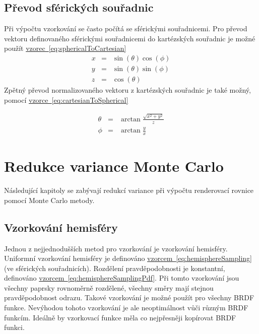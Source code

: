 \documentclass[czech,master]{diploma}
\begin{document}
\section{Převod sférických souřadnic}
Při výpočtu vzorkování se často počítá se sférickými souřadnicemi. Pro převod vektoru definovaného sférickými souřadnicemi do kartézských souřadnic je možné použít \hyperref[eq:sphericalToCartesian]{vzorec~\ref{eq:sphericalToCartesian}}
\begin{eqnarray}
  x & = & \sin(\theta)\cos(\phi)\nonumber \\
  y & = & \sin(\theta)\sin(\phi)\nonumber \\
  z & = & \cos(\theta)\label{eq:sphericalToCartesian}
\end{eqnarray}
Zpětný převod normalizovaného vektoru z kartézských souřadnic je také možný, pomocí \hyperref[eq:cartesianToSpherical]{vzorce~\ref{eq:cartesianToSpherical}}

\begin{eqnarray}
  \theta & = & \arctan \frac{\sqrt{x^2 + y^2}}{z} \nonumber \\
  \phi & = & \arctan \frac{y}{x}\label{eq:cartesianToSpherical}
\end{eqnarray}

\clearpage
\chapter{Redukce variance Monte Carlo}\label{sec:reduction}
Následující kapitoly se zabývají redukcí variance při výpočtu renderovací rovnice pomocí Monte Carlo metody.

\section{Vzorkování hemisféry} \label{sec:hemisphere}
Jednou z nejjednodušších metod pro vzorkování je vzorkování hemisféry. Uniformní vzorkování hemisféry je definováno \hyperref[eq:hemisphereSampling]{vzorcem~\ref{eq:hemisphereSampling}} (ve sférických souřadnicích). Rozdělení pravděpodobnosti je konstantní, definováno \hyperref[eq:hemisphereSamplingPdf]{vzorcem~\ref{eq:hemisphereSamplingPdf}}. Při tomto vzorkování jsou všechny paprsky rovnoměrně rozdělené, všechny směry mají stejnou pravděpodobnost odrazu. Takové vzorkování je možné použít pro všechny BRDF funkce. Nevýhodou tohoto vzorkování je ale neoptimálnost vůči různým BRDF funkcím. Ideálně by vzorkovací funkce měla co nejpřesněji kopírovat BRDF funkci. \par
\end{document}
